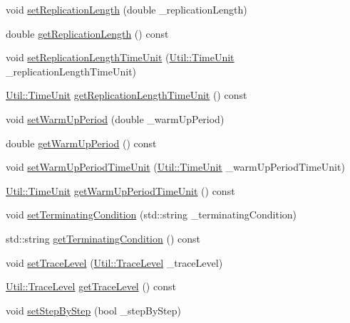 \begin{DoxyCompactItemize}
\item 
void \hyperlink{class_model_a5be13e4bb83891e8caed52b3eae1470f}{set\-Replication\-Length} (double \-\_\-replication\-Length)
\item 
double \hyperlink{class_model_a6bb4d4fbf90f49c990a00385a9df18d9}{get\-Replication\-Length} () const 
\item 
void \hyperlink{class_model_a0261d2009ad7a3f9025e31cf02e6297a}{set\-Replication\-Length\-Time\-Unit} (\hyperlink{class_util_aadbd82055afeaa7d4fb4da513de628ff}{Util\-::\-Time\-Unit} \-\_\-replication\-Length\-Time\-Unit)
\item 
\hyperlink{class_util_aadbd82055afeaa7d4fb4da513de628ff}{Util\-::\-Time\-Unit} \hyperlink{class_model_aeaba7aa3fb5a75f469b7617910eee446}{get\-Replication\-Length\-Time\-Unit} () const 
\item 
void \hyperlink{class_model_ac6e4c4bd49b999b2f6ce5ad97d45bbae}{set\-Warm\-Up\-Period} (double \-\_\-warm\-Up\-Period)
\item 
double \hyperlink{class_model_aa7b278f97a29269a18dbcbb6513f39da}{get\-Warm\-Up\-Period} () const 
\item 
void \hyperlink{class_model_a864c1a3f96cd05b83894042e41ef5ea6}{set\-Warm\-Up\-Period\-Time\-Unit} (\hyperlink{class_util_aadbd82055afeaa7d4fb4da513de628ff}{Util\-::\-Time\-Unit} \-\_\-warm\-Up\-Period\-Time\-Unit)
\item 
\hyperlink{class_util_aadbd82055afeaa7d4fb4da513de628ff}{Util\-::\-Time\-Unit} \hyperlink{class_model_a12a97aefe53ac31b8e7801b50a87715a}{get\-Warm\-Up\-Period\-Time\-Unit} () const 
\item 
void \hyperlink{class_model_a480b4220ecfe82a1826ca29366a8d2b6}{set\-Terminating\-Condition} (std\-::string \-\_\-terminating\-Condition)
\item 
std\-::string \hyperlink{class_model_a3da1140b818632e728fd57445ab1880b}{get\-Terminating\-Condition} () const 
\item 
void \hyperlink{class_model_a538fdc09de27b077b4e4c84fdc78a61e}{set\-Trace\-Level} (\hyperlink{class_util_a604561d00f5999b5ca280401140e58d9}{Util\-::\-Trace\-Level} \-\_\-trace\-Level)
\item 
\hyperlink{class_util_a604561d00f5999b5ca280401140e58d9}{Util\-::\-Trace\-Level} \hyperlink{class_model_a0fa341be1579f13861af2eda84d4f840}{get\-Trace\-Level} () const 
\item 
void \hyperlink{class_model_a2b4b1bb4e9c082e8b0c893a35f5a8f53}{set\-Step\-By\-Step} (bool \-\_\-step\-By\-Step)
\item 

\end{DoxyCompactItemize}
